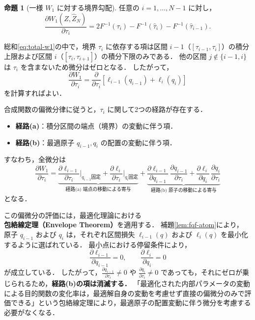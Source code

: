 \documentclass[a4paper,10pt]{jsarticle}
\makeatletter
\theoremstyle{definition}
\newtheorem{proposition}{命題}[section]
\renewenvironment{proof}[1][\proofname]{\par
  \pushQED{\qed}%
  \normalfont \topsep6\p@\@plus6\p@\relax
  \trivlist
  \item[\hskip\labelsep\textbf{#1}]\ignorespaces
}{%
  \popQED\endtrivlist\@endpefalse
}
\renewcommand{\proofname}{証明}
\newcommand{\Wone}{W_1}
\renewcommand{\Finv}{F^{-1}}
\makeatother
\begin{document}
\begin{proposition}[一様 $\Wone$ に対する境界勾配]
\label{prop:fqf-grad}
任意の $i=1,\dots,N-1$ に対し，
\begin{equation}
  \frac{\partial \Wone(Z, \hat Z_N)}{\partial\tau_i} = 2\Finv(\tau_i) - \Finv(\hat\tau_i) - \Finv(\hat\tau_{i-1}).
  \label{eq:fqf-prop1}
\end{equation}
\end{proposition}

\begin{proof}
総和\eqref{eq:total-w1}の中で，境界 $\tau_i$ に依存する項は区間 $i-1$（$[\tau_{i-1}, \tau_i]$）の積分上限および区間 $i$（$[\tau_i, \tau_{i+1}]$）の積分下限のみである．
他の区間 $j \notin \{i-1, i\}$ は $\tau_i$ を含まないため微分はゼロとなる．
したがって，
\begin{equation}
  \frac{\partial \Wone}{\partial\tau_i} = \frac{\partial}{\partial\tau_i}\left[ \ell_{i-1}(q_{i-1}) + \ell_i(q_i) \right]
\end{equation}
を計算すればよい．

合成関数の偏微分律に従うと，$\tau_i$ に関して2つの経路が存在する．
\begin{itemize}
  \item \textbf{経路(a)}：積分区間の端点（境界）の変動に伴う項．
  \item \textbf{経路(b)}：最適原子 $q_{i-1}, q_i$ の配置の変動に伴う項．
\end{itemize}
すなわち，全微分は
\begin{equation}
  \frac{\partial \Wone}{\partial\tau_i} = \underbrace{\frac{\partial \ell_{i-1}}{\partial\tau_i}\Bigg|_{q_{i-1}\text{固定}} + \frac{\partial \ell_i}{\partial\tau_i}\Bigg|_{q_i\text{固定}}}_{\text{経路(a) 端点の移動による寄与}} + \underbrace{\frac{\partial \ell_{i-1}}{\partial q_{i-1}}\,\frac{\partial q_{i-1}}{\partial\tau_i} + \frac{\partial \ell_i}{\partial q_i}\,\frac{\partial q_i}{\partial\tau_i}}_{\text{経路(b) 原子の移動による寄与}}
  \label{eq:chain-rule-grad}
\end{equation}
となる．

この偏微分の評価には，最適化理論における\textbf{包絡線定理（Envelope Theorem）}を適用する．
補題\ref{lem:fqf-atom}により，
原子 $q_{i-1}$ および $q_i$ は，それぞれ区間損失 $\ell_{i-1}(q)$ および $\ell_i(q)$ を最小化するように選ばれている．
最小点における停留条件により，
\begin{equation}
  \frac{\partial \ell_{i-1}}{\partial q_{i-1}} = 0,\qquad \frac{\partial \ell_i}{\partial q_i} = 0
\end{equation}
が成立している．
したがって，$\frac{\partial q_{i-1}}{\partial\tau_i} \ne 0$ や $\frac{\partial q_i}{\partial\tau_i} \ne 0$ であっても，それにゼロが乗じられるため，\textbf{経路(b)の項は消滅する．}
「最適化された内部パラメータの変動による目的関数の変化率は，最適解自身の変動を考慮せず直接の偏微分のみで評価できる」という包絡線定理により，最適原子の配置変動に伴う微分を考慮する必要がなくなる．


\end{proof}
\end{document}
